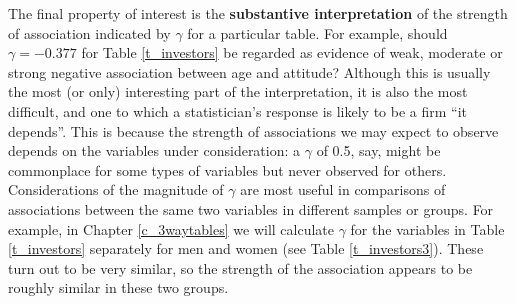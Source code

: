 The final property of interest is the \textbf{substantive
interpretation} of the strength of association indicated by $\gamma$ for
a particular table. For example, should $\gamma=-0.377$ for Table
\ref{t_investors} be regarded as evidence of weak, moderate or strong
negative association between age and attitude? Although this is usually
the most (or only) interesting part of the interpretation, it is also
the most difficult, and one to which a statistician's response is likely
to be a firm ``it depends''. This is because the strength of
associations we may expect to observe depends on the variables under
consideration: a $\gamma$ of 0.5, say, might be commonplace for some
types of variables but never observed for others. Considerations of the
magnitude of $\gamma$ are most useful in comparisons of associations
between the same two variables in different samples or groups. For
example, in Chapter \ref{c_3waytables} we will calculate $\gamma$ for
the variables in Table \ref{t_investors} separately for men and women
(see Table \ref{t_investors3}). These turn out to be very similar, so
the strength of the association appears to be roughly similar in these
two groups.

